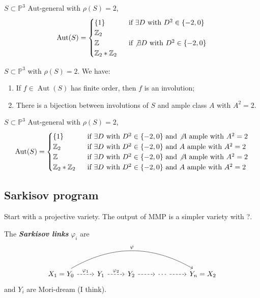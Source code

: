 \begin{prop}\leavevmode
\(S \subset \mathbb{P}^3\) Aut-general with \(\rho(S)=2\),
\[\operatorname{Aut}(S)=\begin{cases}
	\{1\}\qquad & \text{ if \(\exists D\) with \(D^2 \in \{-2,0\}\)} \\
	\mathbb{Z}_2\qquad &\\
	\mathbb{Z} & \text{ if \(\not \exists D\) with \(D^2 \in \{-2,0\}\)} \\
	\mathbb{Z}_2 * \mathbb{Z}_2
\end{cases}\]
\end{prop}

\begin{prop}\leavevmode
\(S \subset \mathbb{P}^3\) with \(\rho(S)=2\). We have:
\begin{enumerate}
\item  If \(f \in \operatorname{Aut}(S)\) has finite order, then \(f\) is an involution;
\item There is a bijection between involutions of \(S\) and ample class \(A\) with \(A^2=2.\)
\end{enumerate}
\end{prop}

\begin{prop}\leavevmode
\(S \subset \mathbb{P}^3\) Aut-general with \(\rho(S)=2\),
\[\operatorname{Aut}(S)=\begin{cases}
	\{1\}\qquad & \text{ if \(\exists D\) with \(D^2 \in \{-2,0\}\) and \(\not A\) ample with \(A^2=2\)} \\
	\mathbb{Z}_2\qquad &\text{ if \(\exists D\) with \(D^2 \in \{-2,0\}\) and \( A\) ample with \(A^2=2\)}\\
	\mathbb{Z} & \text{ if \(\exists D\) with \(D^2 \in \{-2,0\}\) and \(\not A\) ample with \(A^2=2\)}\\
	\mathbb{Z}_2 * \mathbb{Z}_2 & \text{ if \(\exists D\) with \(D^2 \in \{-2,0\}\) and \( A\) ample with \(A^2=2\)}\
\end{cases}\]
\end{prop}

\subsection{Sarkisov program}

Start with a projective variety. The output of MMP is a simpler variety with ?.


\begin{thm}[Sakisov Program]\leavevmode
	The  \textit{\textbf{Sarkisov links}}  $\varphi_i$ are
	\[\begin{tikzcd}
		X_1=Y_0\arrow[r,dashed,"\varphi_1"]\arrow[rrrr,bend left,"\varphi"]&Y_1\arrow[r,dashed,"\varphi_2"]&Y_2\arrow[r,dashed]&\cdots \arrow[r,dashed]&Y_n=X_2
	\end{tikzcd}\]
	and \(Y_i\) are Mori-dream (I think).
\end{thm}

